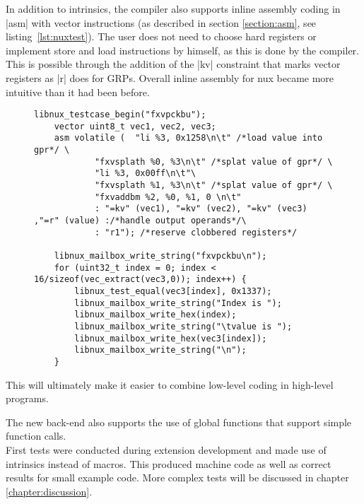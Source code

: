 In addition to intrinsics, the compiler also supports inline assembly coding in |asm| with vector instructions (as described in section \ref{section:asm}, see listing~\ref{lst:nuxtest}).
The user does not need to choose hard registers or implement store and load instructions by himself, as this is done by the compiler.
This is possible through the addition of the |kv| constraint that marks vector registers as |r| does for GRPs.
Overall inline assembly for nux became more intuitive than it had been before.
\begin{figure}[htb]
{
\begin{lstlisting}[caption={Example of nux Test.\hspace{\textwidth} This This test directly loads two values as immediates into registers and splats them into vector registers. Those vector registers are added and the result saved in a variable. The result is then tested and also written into the mailbox for analysis.}, label=lst:nuxtest]
	libnux_testcase_begin("fxvpckbu");
	vector uint8_t vec1, vec2, vec3;
	asm volatile (	"li %3, 0x1258\n\t" /*load value into gpr*/ \
			"fxvsplath %0, %3\n\t" /*splat value of gpr*/ \
			"li %3, 0x00ff\n\t"\
			"fxvsplath %1, %3\n\t" /*splat value of gpr*/ \
			"fxvaddbm %2, %0, %1, 0 \n\t"
			: "=kv" (vec1), "=kv" (vec2), "=kv" (vec3) ,"=r" (value) :/*handle output operands*/\
			: "r1"); /*reserve clobbered registers*/

	libnux_mailbox_write_string("fxvpckbu\n");
	for (uint32_t index = 0; index < 16/sizeof(vec_extract(vec3,0)); index++) {
		libnux_test_equal(vec3[index], 0x1337);
		libnux_mailbox_write_string("Index is ");
		libnux_mailbox_write_hex(index);
		libnux_mailbox_write_string("\tvalue is ");
		libnux_mailbox_write_hex(vec3[index]);
		libnux_mailbox_write_string("\n");
	}
\end{lstlisting}
}
\end{figure}

This will ultimately make it easier to combine low-level coding in high-level programs.

The new back-end also supports the use of global functions that support simple function calls.
\\
First tests were conducted during extension development and made use of intrinsics instead of macros.
This produced machine code as well as correct results for small example code.
More complex tests will be discussed in chapter \ref{chapter:discussion}.

